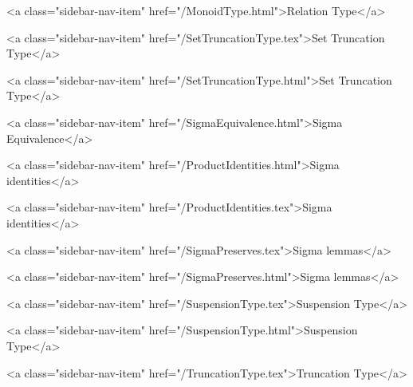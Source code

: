       
    
      
        
          <a class="sidebar-nav-item" href="/MonoidType.html">Relation Type</a>
        
      
    
      
        
          <a class="sidebar-nav-item" href="/SetTruncationType.tex">Set Truncation Type</a>
        
      
    
      
        
          <a class="sidebar-nav-item" href="/SetTruncationType.html">Set Truncation Type</a>
        
      
    
      
        
          <a class="sidebar-nav-item" href="/SigmaEquivalence.html">Sigma Equivalence</a>
        
      
    
      
        
          <a class="sidebar-nav-item" href="/ProductIdentities.html">Sigma identities</a>
        
      
    
      
        
          <a class="sidebar-nav-item" href="/ProductIdentities.tex">Sigma identities</a>
        
      
    
      
        
          <a class="sidebar-nav-item" href="/SigmaPreserves.tex">Sigma lemmas</a>
        
      
    
      
        
          <a class="sidebar-nav-item" href="/SigmaPreserves.html">Sigma lemmas</a>
        
      
    
      
        
          <a class="sidebar-nav-item" href="/SuspensionType.tex">Suspension Type</a>
        
      
    
      
        
          <a class="sidebar-nav-item" href="/SuspensionType.html">Suspension Type</a>
        
      
    
      
        
          <a class="sidebar-nav-item" href="/TruncationType.tex">Truncation Type</a>
        
